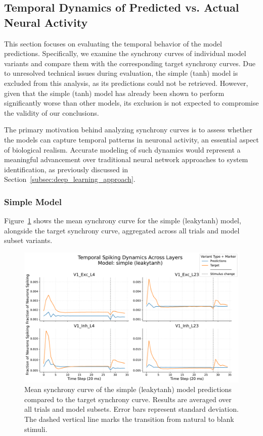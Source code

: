 \subsection{Temporal Dynamics of Predicted vs. Actual Neural Activity}
\label{subsec:prediction_target_comparison_variants}

This section focuses on evaluating the temporal behavior of the model predictions. Specifically, we examine the synchrony curves of individual model variants and compare them with the corresponding target synchrony curves. Due to unresolved technical issues during evaluation, the simple (tanh) model is excluded from this analysis, as its predictions could not be retrieved. However, given that the simple (tanh) model has already been shown to perform significantly worse than other models, its exclusion is not expected to compromise the validity of our conclusions.

The primary motivation behind analyzing synchrony curves is to assess whether the models can capture temporal patterns in neuronal activity, an essential aspect of biological realism. Accurate modeling of such dynamics would represent a meaningful advancement over traditional neural network approaches to system identification, as previously discussed in Section~\ref{subsec:deep_learning_approach}.

\subsubsection{Simple Model}
\label{{subsubsec:simpl_leakytanh_eval}}

Figure~\ref{fig:synchrony_curve_simple_leaky_tanh} shows the mean synchrony curve for the simple (leakytanh) model, alongside the target synchrony curve, aggregated across all trials and model subset variants.

\begin{figure}
    \centering
    \includegraphics[width=\linewidth]{img/plots/separate_model_synchrony_curve_simple_evaluation_new.pdf}
    \caption{Mean synchrony curve of the simple (leakytanh) model predictions compared to the target synchrony curve. Results are averaged over all trials and model subsets. Error bars represent standard deviation. The dashed vertical line marks the transition from natural to blank stimuli.}
    \label{fig:synchrony_curve_simple_leaky_tanh}
\end{figure}

